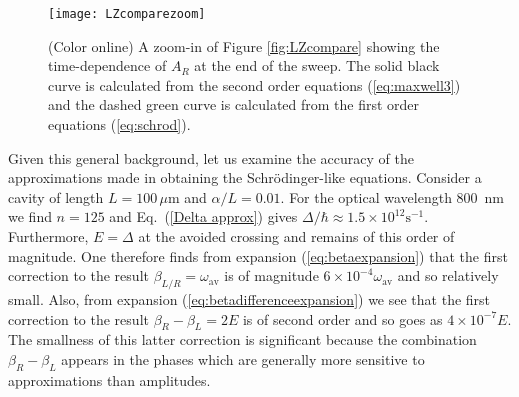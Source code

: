 \documentclass[twocolumn,english,pra,aps,superscriptaddress,floatfix]{revtex4-1}
\begin{document}
\begin{figure}
\texttt{[image: LZcomparezoom]}
\caption{(Color online) A zoom-in of Figure \ref{fig:LZcompare} showing the time-dependence of $A_{R}$ at the end of the sweep. The solid black curve is calculated from the second order equations (\ref{eq:maxwell3}) and the dashed green curve is calculated from the first order equations (\ref{eq:schrod}).}
\label{fig:LZcomparezoom}
\end{figure}


Given this general background, let us examine the accuracy of the approximations made in obtaining the Schr\"{o}dinger-like equations. Consider a cavity of length $L=100 \, \mu$m and $\alpha/L=0.01$. For the optical wavelength $800$\, nm  we find $n = 125 $ and Eq.\  (\ref{Delta approx}) gives $\Delta /\hbar \approx 1.5 \times10^{12}\mathrm{s}^{-1}$. Furthermore, $E = \Delta$ at the avoided crossing and remains of this order of magnitude. One therefore finds from expansion (\ref{eq:betaexpansion}) that the first correction to the result $\beta_{L/R}=\omega_{\mathrm{av}}$ is of magnitude $ 6 \times10^{-4} \omega_{\mathrm{av}}$ and so relatively small. Also, from expansion (\ref{eq:betadifferenceexpansion}) we see that the first correction to the result $\beta_{R}-\beta_{L}=2 E$ is of second order and so goes as $4 \times 10^{-7} E$. The smallness of this latter correction is significant because the combination $\beta_{R}-\beta_{L}$ appears in the phases which are generally more sensitive to approximations than amplitudes. 
\end{document}

